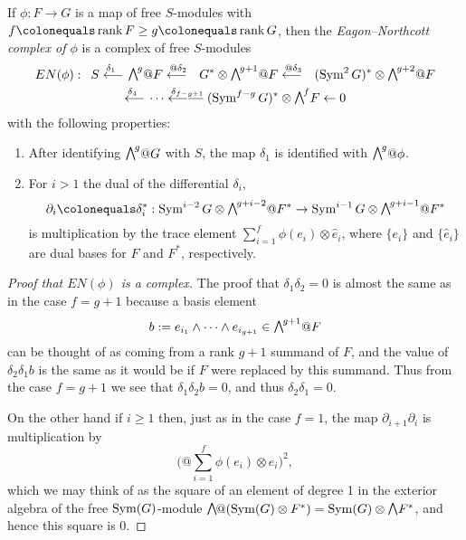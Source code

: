 \begin{definition}
If $\phi: F\to G$ is a map of free $S$-modules with 
$f\colonequals \rank F\geq  g\colonequals  \rank G$, then the
\emph{Eagon--Northcott complex of $\phi$}
%
is a complex of free $S$-modules
\begin{multline*}
EN(\phi): \quad
S \luto{\delta_1}
\mwedge^g @F
\luto{@\delta_{2}}
G^*\otimes \mwedge^{g+1}@ F  \luto{@\delta_{3}}
(\Sym^2G)^*\otimes\mwedge^{g+2}@F  \\
\luto{\delta_{4}}\cdots\luto{\delta_{f-g+1}}\hskip-23pt-\hskip-4pt-
(\Sym^{f-g}G)^*\otimes\mwedge^fF
\leftarrow 0
\end{multline*}
with the following properties:
\begin{enumerate}

\item After identifying $\mwedge^{g}@G$ with $S$, the map $\delta_{1}$
is identified with $\mwedge^{g}@\phi$.

\item For $i>1$ the dual of the differential $\delta_{i}$,
$$
\partial_{i} \colonequals \delta_{i}^{*}: \Sym^{i-2}G \otimes \mwedge^{g+i-2}@F^{*} \to
\Sym^{i-1}G \otimes \mwedge^{g+i-1}@F^{*}
$$ 
is multiplication by the trace element
%
$\sum_{i = 1}^{f} \phi(e_{i}) \otimes \hat e_{i}$,
where
$\{e_{i}\}$ and $\{\hat e_{i}\}$ are dual bases for $F$ and $F^{*}$, respectively.
\end{enumerate}
\end{definition}

\begin{proof}[Proof that $EN(\phi)$ is a complex]
 The proof that $\delta_{1}\delta_{2} = 0$ is almost the same as in the
case $f = g+1$ because
a basis element
$$
b: = e_{i_{1}}\wedge \cdots \wedge e_{i_{g+1}} \in \mwedge^{g+1}@F
$$
can be thought of as coming from a rank $g+1$ summand of $F$, and the
value of $\delta_{2}\delta_{1}b$
is the same as it would be if $F$ were replaced by this summand. Thus
from the case $f=g+1$ we see
that $\delta_{1}\delta_{2}b = 0$, and thus $\delta_{2}\delta_{1} = 0$.

On the other hand if $i\geq 1$ then, just as in the case $f=1$,
 the map $\partial_{i+1}\partial_{i}$
is multiplication by
$$
\biggl(@\sum_{i = 1}^{f} \phi(e_{i}) \otimes \hat e_{i}\biggr)^{\!2},
$$
which we may think of as the square of an element of degree 1 in the
exterior algebra
of the free $\operatorname{Sym}(G)$-module $\mwedge@(\Sym(G)\otimes F^{*}) = \Sym(G)
\otimes \mwedge \,F^{*}$, and hence this square is 0.
\end{proof}

